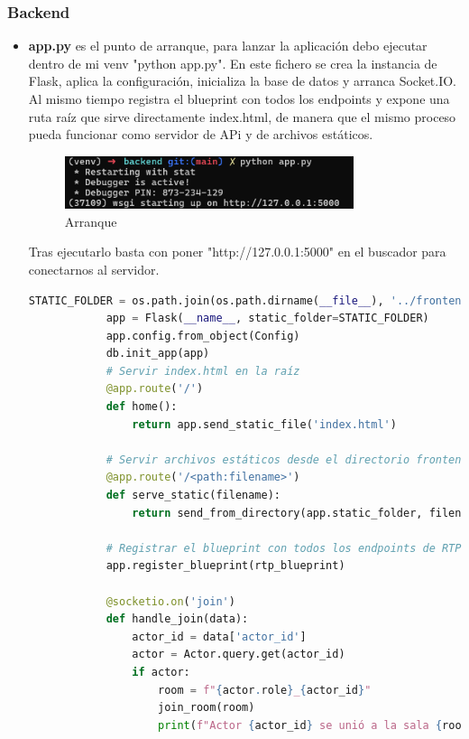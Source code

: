 \subsubsection{Backend}
\label{subsubsec:Backend}

\begin{itemize}
    \item \textbf{app.py} es el punto de arranque, para lanzar la aplicación debo ejecutar dentro de mi venv "python app.py". En este fichero se crea la instancia de Flask, aplica la configuración, inicializa la base de datos y arranca Socket.IO. Al mismo tiempo registra el blueprint con todos los endpoints y expone una ruta raíz que sirve directamente index.html, de manera que el mismo proceso pueda funcionar como servidor de APi y de archivos estáticos. 
        \begin{figure}[H]
            \centering
            \includegraphics[width=0.8\textwidth]{Imagenes/Arranque1.png}
            \caption{Arranque}
            \label{fig:Arranque}
        \end{figure}
        Tras ejecutarlo basta con poner "http://127.0.0.1:5000"     en el buscador para conectarnos al servidor.


        \begin{lstlisting}[language=Python, style=custom, caption={Configuración y arranque del servidor Flask-SocketIO}]
            STATIC_FOLDER = os.path.join(os.path.dirname(__file__), '../frontend')
            app = Flask(__name__, static_folder=STATIC_FOLDER)
            app.config.from_object(Config)
            db.init_app(app)
            # Servir index.html en la raíz
            @app.route('/')
            def home():
                return app.send_static_file('index.html')

            # Servir archivos estáticos desde el directorio frontend
            @app.route('/<path:filename>')
            def serve_static(filename):
                return send_from_directory(app.static_folder, filename)

            # Registrar el blueprint con todos los endpoints de RTP
            app.register_blueprint(rtp_blueprint)

            @socketio.on('join')
            def handle_join(data):
                actor_id = data['actor_id']
                actor = Actor.query.get(actor_id)
                if actor:
                    room = f"{actor.role}_{actor_id}"
                    join_room(room)
                    print(f"Actor {actor_id} se unió a la sala {room}")


\end{lstlisting}
\end{itemize}
